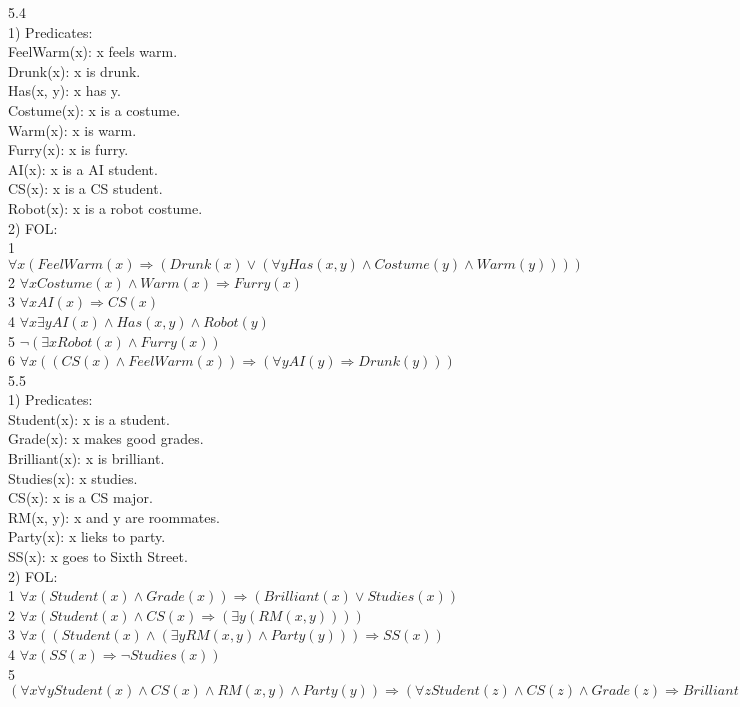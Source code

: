 \documentclass[a4paper]{article}
\begin{document}
5.4\\
1) Predicates:\\
FeelWarm(x): x feels warm.\\
Drunk(x): x is drunk.\\
Has(x, y): x has y.\\
Costume(x): x is a costume.\\
Warm(x): x is warm.\\
Furry(x): x is furry.\\
AI(x): x is a AI student.\\
CS(x): x is a CS student.\\
Robot(x): x is a robot costume.\\

2) FOL:\\
1 $\forall x (FeelWarm(x) \Rightarrow (Drunk(x) \vee (\forall y Has(x, y) \wedge Costume(y) \wedge Warm(y))))$\\
2 $\forall x Costume(x) \wedge Warm(x) \Rightarrow Furry(x)$\\
3 $\forall x AI(x) \Rightarrow CS(x)$\\
4 $\forall x \exists y AI(x) \wedge Has(x, y) \wedge Robot(y)$\\
5 $\neg (\exists x Robot(x) \wedge Furry(x))$\\
6 $\forall x((CS(x) \wedge FeelWarm(x)) \Rightarrow (\forall y AI(y) \Rightarrow Drunk(y)))$\\

5.5\\
1) Predicates:\\
Student(x): x is a student.\\
Grade(x): x makes good grades.\\
Brilliant(x): x is brilliant.\\
Studies(x): x studies.\\
CS(x): x is a CS major.\\
RM(x, y): x and y are roommates.\\
Party(x): x lieks to party.\\
SS(x): x goes to Sixth Street.\\

2) FOL:\\
1 $\forall x (Student(x) \wedge Grade(x)) \Rightarrow (Brilliant(x) \vee Studies(x))$\\
2 $\forall x (Student(x) \wedge CS(x) \Rightarrow (\exists y (RM(x, y)))) $\\
3 $\forall x ((Student(x) \wedge (\exists y RM(x, y) \wedge Party(y))) \Rightarrow SS(x)) $\\
4 $\forall x (SS(x) \Rightarrow \neg Studies(x))$\\
5 $(\forall x \forall y Student(x) \wedge CS(x) \wedge RM(x, y) \wedge Party(y)) \Rightarrow (\forall z Student(z) \wedge CS(z) \wedge Grade(z) \Rightarrow Brilliant(z))$\\
\end{document}
